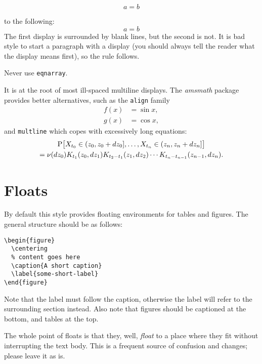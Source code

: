 \begin{displaymath}
  a = b
\end{displaymath}

to the following:
\begin{displaymath}
  a = b
\end{displaymath}
The first display is surrounded by blank lines, but the second is not.
It is bad style to start a paragraph with a display (you should always
tell the reader what the display means first), so the rule follows.

\begin{Rule}
  Never use \lstinline-eqnarray-.
\end{Rule}

\newcommand{\package}{\emph}

It is at the root of most ill-spaced multiline displays.  The
\package{amsmath} package provides better alternatives, such as the
\lstinline-align- family
\begin{align*}
  f(x) &= \sin x, \\
  g(x) &= \cos x,
\end{align*}
and \lstinline-multline- which copes with excessively long equations:
\begin{multline*}
  \def\P{\mathrm P}
  \P\bigl[X_{t_0} \in (z_0, z_0+dz_0],\ldots, X_{t_n}\in(z_n,z_n+dz_n]\bigr]
  \\= \nu(dz_0) K_{t_1}(z_0,dz_1) K_{t_2-t_1}(z_1,dz_2)\cdots
  K_{t_n-t_{n-1}}(z_{n-1},dz_n).
\end{multline*}


\section*{Floats}

By default this style provides floating environments for tables and
figures.  The general structure should be as follows:
\begin{lstlisting}
\begin{figure}
  \centering
  % content goes here
  \caption{A short caption}
  \label{some-short-label}
\end{figure}
\end{lstlisting}
Note that the label must follow the caption, otherwise the label will
refer to the surrounding section instead.  Also note that figures
should be captioned at the bottom, and tables at the top.

The whole point of floats is that they, well, \emph{float} to a place
where they fit without interrupting the text body.  This is a frequent
source of confusion and changes; please leave it as is.

